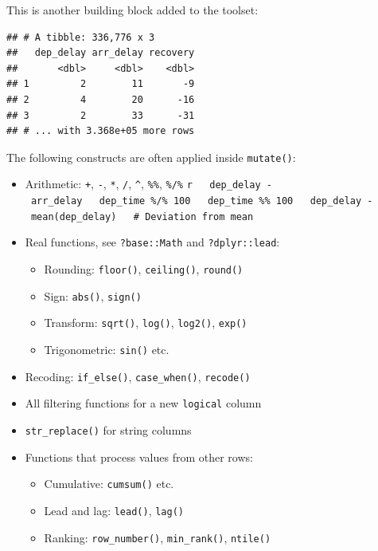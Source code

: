 \documentclass[]{book}
\newenvironment{Shaded}{}{}
\newcommand{\DataTypeTok}[1]{#1}
\newcommand{\KeywordTok}[1]{\textcolor[rgb]{0.00,0.00,1.00}{#1}}
\newcommand{\NormalTok}[1]{#1}
\newcommand{\OperatorTok}[1]{#1}
\newcommand{\StringTok}[1]{\textcolor[rgb]{0.00,0.50,0.50}{#1}}
\providecommand{\tightlist}{%
  \setlength{\itemsep}{0pt}\setlength{\parskip}{0pt}}
\begin{document}
This is another building block added to the toolset:

\begin{Shaded}
\end{Shaded}

\begin{verbatim}
## # A tibble: 336,776 x 3
##   dep_delay arr_delay recovery
##       <dbl>     <dbl>    <dbl>
## 1         2        11       -9
## 2         4        20      -16
## 3         2        33      -31
## # ... with 3.368e+05 more rows
\end{verbatim}

The following constructs are often applied inside \texttt{mutate()}:

\begin{itemize}
\item
  Arithmetic: \texttt{+}, \texttt{-}, \texttt{*}, \texttt{/}, \texttt{\^{}}, \texttt{\%\%}, \texttt{\%/\%}
  \texttt{r\ \ \ dep\_delay\ -\ arr\_delay\ \ \ dep\_time\ \%/\%\ 100\ \ \ dep\_time\ \%\%\ 100\ \ \ dep\_delay\ -\ mean(dep\_delay)\ \ \ \#\ Deviation\ from\ mean}
\item
  Real functions, see \texttt{?base::Math} and \texttt{?dplyr::lead}:

  \begin{itemize}
  \tightlist
  \item
    Rounding: \texttt{floor()}, \texttt{ceiling()}, \texttt{round()}
  \item
    Sign: \texttt{abs()}, \texttt{sign()}
  \item
    Transform: \texttt{sqrt()}, \texttt{log()}, \texttt{log2()}, \texttt{exp()}
  \item
    Trigonometric: \texttt{sin()} etc.
  \end{itemize}
\item
  Recoding: \texttt{if\_else()}, \texttt{case\_when()}, \texttt{recode()}
\item
  All filtering functions for a new \texttt{logical} column
\item
  \texttt{str\_replace()} for string columns
\item
  Functions that process values from other rows:

  \begin{itemize}
  \tightlist
  \item
    Cumulative: \texttt{cumsum()} etc.
  \item
    Lead and lag: \texttt{lead()}, \texttt{lag()}
  \item
    Ranking: \texttt{row\_number()}, \texttt{min\_rank()}, \texttt{ntile()}
  \end{itemize}
\end{itemize}
\end{document}
